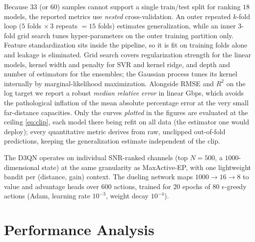 \documentclass[journal]{IEEEtran}
\begin{document}
Because $33$ (or $60$) samples cannot support a single train/test split for ranking $18$
models, the reported metrics use \emph{nested} cross-validation. An outer repeated
$k$-fold loop ($5$ folds $\times\,3$ repeats $=15$ folds) estimates generalization, while
an inner $3$-fold grid search tunes hyper-parameters on the outer training partition only.
Feature standardization sits inside the pipeline, so it is fit on training folds alone and
leakage is eliminated. Grid search covers regularization strength for the
linear models, kernel width and penalty for SVR and kernel ridge, and depth and number of
estimators for the ensembles; the Gaussian process tunes its kernel internally by
marginal-likelihood maximization. Alongside RMSE and $R^2$ on the log target we report a
robust \emph{median relative error} in linear Gbps, which avoids the pathological
inflation of the mean absolute percentage error at the very small far-distance
capacities. Only the curves \emph{plotted} in the figures are evaluated at the ceiling
\eqref{eq:clip}, each model there being refit on all data (the estimator one would
deploy); every quantitative metric derives from raw, unclipped out-of-fold predictions,
keeping the generalization estimate independent of the clip.

The D3QN operates on individual SNR-ranked channels (top $N=500$, a $1000$-dimensional
state) at the same granularity as MaxActive-EP, with one lightweight bandit per
(distance, gain) context. The dueling network maps $1000\!\to\!16\!\to\!8$ to value and
advantage heads over $600$ actions, trained for $20$ epochs of $80$ $\epsilon$-greedy
actions (Adam, learning rate $10^{-3}$, weight decay $10^{-4}$).

\section{Performance Analysis}
\label{sec:perf}
\end{document}
